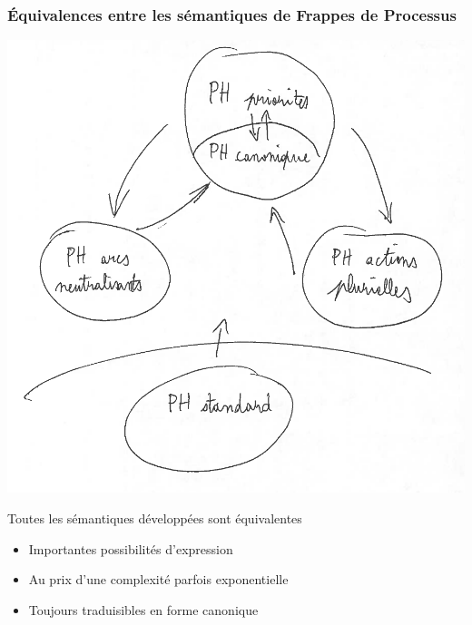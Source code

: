
\begin{frame}[c]
  \frametitle{Équivalences entre les sémantiques de Frappes de Processus}

\begin{center}
\includegraphics[height=.5\textheight]{figs/PH1.png}
\end{center}

Toutes les sémantiques développées sont équivalentes
\begin{itemize}
  \item Importantes possibilités d'expression
  \item Au prix d'une complexité parfois exponentielle
  \item Toujours traduisibles en forme canonique
\end{itemize}

\end{frame}



